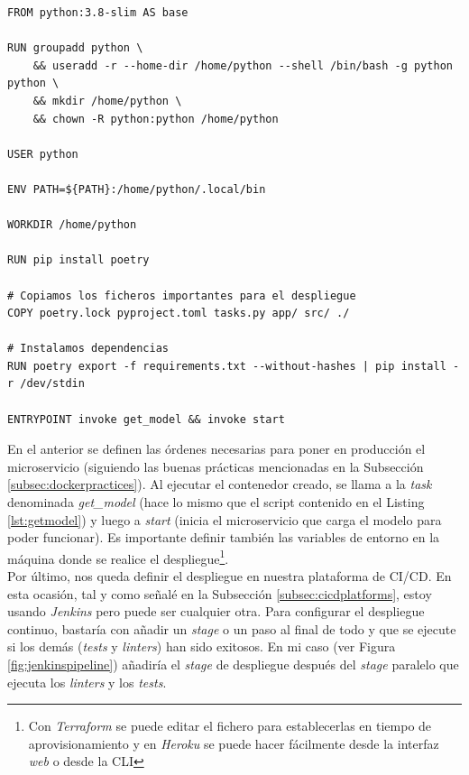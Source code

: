 \begin{lstlisting}[language=docker, caption={Dockerfile para desplegar nuestro microservicio en Heroku o en cualquier máquina}, captionpos=b]
FROM python:3.8-slim AS base

RUN groupadd python \
    && useradd -r --home-dir /home/python --shell /bin/bash -g python python \
    && mkdir /home/python \
    && chown -R python:python /home/python

USER python

ENV PATH=${PATH}:/home/python/.local/bin

WORKDIR /home/python

RUN pip install poetry

# Copiamos los ficheros importantes para el despliegue
COPY poetry.lock pyproject.toml tasks.py app/ src/ ./

# Instalamos dependencias
RUN poetry export -f requirements.txt --without-hashes | pip install -r /dev/stdin

ENTRYPOINT invoke get_model && invoke start

\end{lstlisting}

En el  anterior se definen las órdenes necesarias para poner en producción el microservicio (siguiendo las buenas prácticas mencionadas en la Subsección \ref{subsec:dockerpractices}). Al ejecutar el contenedor creado, se llama a la \textit{task} denominada \textit{get\_model} (hace lo mismo que el script contenido en el Listing \ref{lst:getmodel}) y luego a \textit{start} (inicia el microservicio que carga el modelo para poder funcionar). Es importante definir también las variables de entorno en la máquina donde se realice el despliegue\footnote{Con \textit{Terraform} se puede editar el fichero  para establecerlas en tiempo de aprovisionamiento y en \textit{Heroku} se puede hacer fácilmente desde la interfaz \textit{web} o desde la CLI}.\\

Por último, nos queda definir el despliegue en nuestra plataforma de CI/CD. En esta ocasión, tal y como señalé en la Subsección \ref{subsec:cicdplatforms}, estoy usando \textit{Jenkins} pero puede ser cualquier otra. Para configurar el despliegue continuo, bastaría con añadir un \textit{stage} o un paso al final de todo y que se ejecute si los demás (\textit{tests} y \textit{linters}) han sido exitosos. En mi caso (ver Figura \ref{fig:jenkinspipeline}) añadiría el \textit{stage} de despliegue después del \textit{stage} paralelo que ejecuta los \textit{linters} y los \textit{tests}.\\

